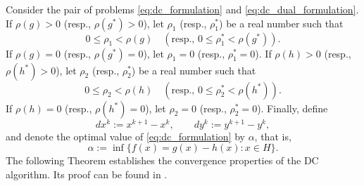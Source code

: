 Consider the pair of problems \eqref{eq:dc_formulation} and \eqref{eq:dc_dual_formulation}. If $\rho(g) > 0$ 
(resp., $\rho(g^*) > 0$), let $\rho_1$ (resp., $\rho_1^*$) be a real number such that
\[
0 \le \rho_1 < \rho(g) \quad (\text{resp., } 0 \le \rho_1^* < \rho(g^*)).
\]
If $\rho(g) = 0$ (resp., $\rho(g^*) = 0$), let $\rho_1 = 0$ (resp., $\rho_1^* = 0$).
If $\rho(h) > 0$ (resp., $\rho(h^*) > 0$), let $\rho_2$ (resp., $\rho_2^*$) be a real number such that
\[
0 \le \rho_2 < \rho(h) \quad (\text{resp., } 0 \le \rho_2^* < \rho(h^*)).
\]
If $\rho(h) = 0$ (resp., $\rho(h^*) = 0$), let $\rho_2 = 0$ (resp., $\rho_2^* = 0$). Finally, define
\[
d x^k := x^{k+1} - x^k, \qquad d y^k := y^{k+1} - y^k,
\]
and denote the optimal value of \eqref{eq:dc_formulation} by $\alpha$, that is,
\[
\alpha := \inf \{ f(x) = g(x) - h(x) : x \in H \}.
\]
The following Theorem establishes the convergence properties of the DC algorithm. Its proof can be found in \cite[Theorem 2.11]{lim}.
